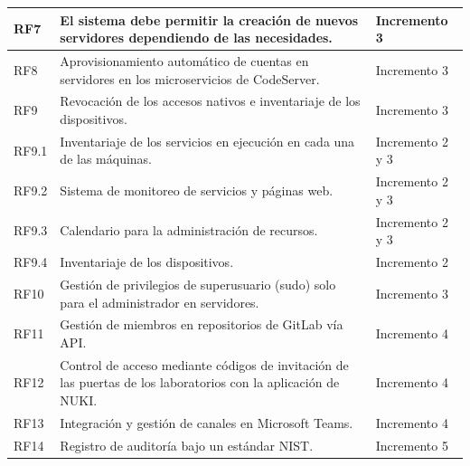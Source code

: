 \begin{center}
\begin{longtable}{lp{8cm}l}
RF7   & El sistema debe permitir la creación de nuevos servidores dependiendo de las necesidades. & Incremento 3 \\
\midrule
RF8   & Aprovisionamiento automático de cuentas en servidores en los microservicios de CodeServer. & Incremento 3 \\
RF9   & Revocación de los accesos nativos e inventariaje de los dispositivos. & Incremento 3 \\
RF9.1 & Inventariaje de los servicios en ejecución en cada una de las máquinas. & Incremento 2 y 3 \\
RF9.2 & Sistema de monitoreo de servicios y páginas web. & Incremento 2 y 3 \\
RF9.3 & Calendario para la administración de recursos. & Incremento 2 y 3 \\
RF9.4 & Inventariaje de los dispositivos. & Incremento 2 \\
RF10  & Gestión de privilegios de superusuario (sudo) solo para el administrador en servidores. & Incremento 3 \\
\midrule
RF11  & Gestión de miembros en repositorios de GitLab vía API. & Incremento 4 \\
RF12  & Control de acceso mediante códigos de invitación de las puertas de los laboratorios con la aplicación de NUKI. & Incremento 4 \\
RF13  & Integración y gestión de canales en Microsoft Teams. & Incremento 4 \\
\midrule
RF14  & Registro de auditoría bajo un estándar NIST. & Incremento 5 \\
\end{longtable}
\end{center}
\normalsize
\newpage

